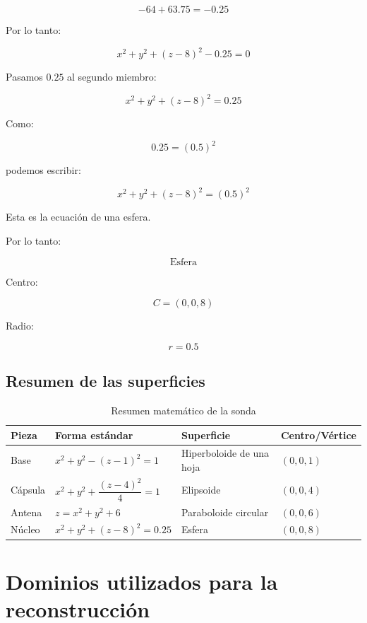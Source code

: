 \documentclass[12pt,a4paper]{article}
\begin{document}
\[-64+63.75=-0.25\]

Por lo tanto:

\[x^2+y^2+(z-8)^2-0.25=0\]

Pasamos $0.25$ al segundo miembro:

\[\boxed{x^2+y^2+(z-8)^2=0.25}\]

Como:

\[0.25=(0.5)^2\]

podemos escribir:

\[\boxed{x^2+y^2+(z-8)^2=(0.5)^2}\]

Esta es la ecuación de una esfera.

Por lo tanto:

\[\boxed{\text{Esfera}}\]

Centro:

\[\boxed{C=(0,0,8)}\]

Radio:

\[\boxed{r=0.5}\]

\subsection{Resumen de las superficies}

\begin{table}[H]
\centering
\caption{Resumen matemático de la sonda}
\begin{tabular}{p{3.2cm} p{5cm} p{3.5cm} p{3cm}}
\toprule
\textbf{Pieza} &
\textbf{Forma estándar} &
\textbf{Superficie} &
\textbf{Centro/Vértice}\\
\midrule

Base &
$x^2+y^2-(z-1)^2=1$ &
Hiperboloide de una hoja &
$(0,0,1)$\\

Cápsula &
$x^2+y^2+\dfrac{(z-4)^2}{4}=1$ &
Elipsoide &
$(0,0,4)$\\

Antena &
$z=x^2+y^2+6$ &
Paraboloide circular &
$(0,0,6)$\\

Núcleo &
$x^2+y^2+(z-8)^2=0.25$ &
Esfera &
$(0,0,8)$\\

\bottomrule
\end{tabular}
\end{table}

\section{Dominios utilizados para la reconstrucción}
\end{document}
